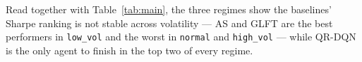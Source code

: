 \documentclass[10pt,twocolumn]{article}
\begin{document}
Read together with Table~\ref{tab:main}, the three regimes show the baselines' Sharpe ranking is not stable across volatility --- AS and GLFT are the best performers in \texttt{low\_vol} and the worst in \texttt{normal} and \texttt{high\_vol} --- while QR-DQN is the only agent to finish in the top two of every regime.
\end{document}
